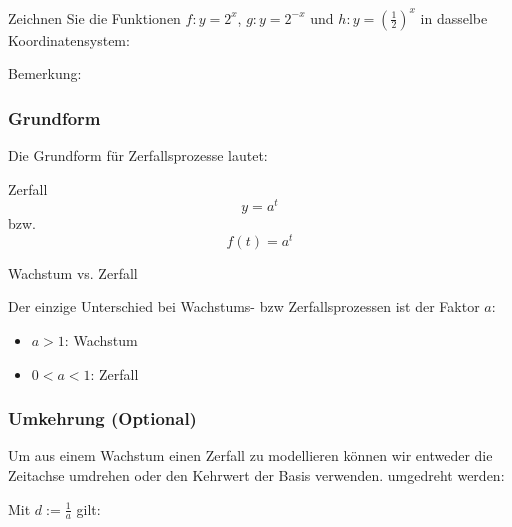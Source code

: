 \newpage



Zeichnen Sie die Funktionen $f: y=2^x$, $g: y=2^{-x}$ und $h: y=\left(\frac12\right)^x$ in dasselbe Koordinatensystem:


Bemerkung: 
\newpage

\subsubsection{Grundform} 
Die Grundform für Zerfallsprozesse lautet:

\begin{definition}{Zerfall}{}
$$y = a^t$$
  bzw.
  $$f(t) = a^t$$
\end{definition}


\begin{gesetz}{Wachstum vs. Zerfall}{}

  Der einzige Unterschied bei Wachstums- bzw Zerfallsprozessen ist der
  Faktor $a$:

  \begin{itemize}
    \item $a>1$: Wachstum
    \item $0<a<1$: Zerfall
  \end{itemize}
  
\end{gesetz}

\subsubsection{Umkehrung (Optional)}
Um aus einem Wachstum einen Zerfall zu modellieren können wir entweder
die Zeitachse umdrehen oder den Kehrwert der Basis verwenden.
umgedreht werden:

Mit $d := \frac1a $ gilt:

\begin{center}
\end{center}

\newpage





